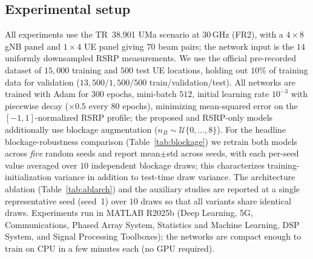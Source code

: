 \documentclass[conference]{IEEEtran}
\begin{document}
\subsection{Experimental setup}
All experiments use the TR~38.901 UMa scenario at $30$\,GHz (FR2), with a
$4\times8$ gNB panel and $1\times4$ UE panel giving $70$ beam pairs; the network
input is the $14$ uniformly downsampled RSRP measurements. We use the official
pre-recorded dataset of $15{,}000$ training and $500$ test UE locations, holding
out $10\%$ of training data for validation ($13{,}500/1{,}500/500$
train/validation/test). All networks are trained with Adam for $300$ epochs,
mini-batch $512$, initial learning rate $10^{-3}$ with piecewise decay
($\times0.5$ every $80$ epochs), minimizing mean-squared error on the
$[-1,1]$-normalized RSRP profile; the proposed and RSRP-only models additionally
use blockage augmentation ($n_B\sim\mathcal{U}\{0,\dots,8\}$). For the headline
blockage-robustness comparison (Table~\ref{tab:blockage}) we retrain both models
across \emph{five} random seeds and report mean$\pm$std across seeds, with each
per-seed value averaged over $10$ independent blockage draws; this characterizes
training-initialization variance in addition to test-time draw variance. The
architecture ablation (Table~\ref{tab:ablarch}) and the auxiliary studies are
reported at a single representative seed (seed~1) over $10$ draws so that all
variants share identical draws. Experiments run in MATLAB R2025b (Deep Learning, 5G,
Communications, Phased Array System, Statistics and Machine Learning, DSP System,
and Signal Processing Toolboxes); the networks are compact enough to train on CPU
in a few minutes each (no GPU required).
\end{document}
